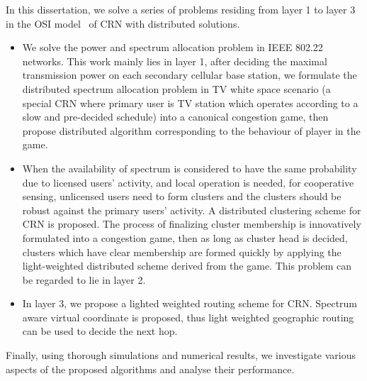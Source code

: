 In this dissertation, we solve a series of problems residing from layer 1 to layer 3 in the OSI model~\cite{osi} of CRN with distributed solutions.
\begin{itemize}
\item We solve the power and spectrum allocation problem in IEEE 802.22 networks.
This work mainly lies in layer 1, after deciding the maximal transmission power on each secondary cellular base station, we formulate the distributed spectrum allocation problem in TV white space scenario (a special CRN where primary user is TV station which operates according to a slow and pre-decided schedule) into a canonical congestion game, then propose distributed algorithm corresponding to the behaviour of player in the game.

\item 
When the availability of spectrum is considered to have the same probability due to licensed users' activity, and local operation is needed, \ie for cooperative sensing, unlicensed users need to form clusters and the clusters should be robust against the primary users' activity.
A distributed clustering scheme for CRN is proposed. 
The process of finalizing cluster membership is innovatively formulated into a congestion game, then as long as cluster head is decided, clusters which have clear membership are formed quickly by applying the  light-weighted distributed scheme derived from the game.
This problem can be regarded to lie in layer 2.

\item In layer 3, we propose a lighted weighted routing scheme for CRN. 
Spectrum aware virtual coordinate is proposed, thus light weighted geographic routing can be used to decide the next hop.
\end{itemize}

Finally, using thorough simulations and numerical results, we investigate various aspects of the proposed algorithms and analyse their performance.